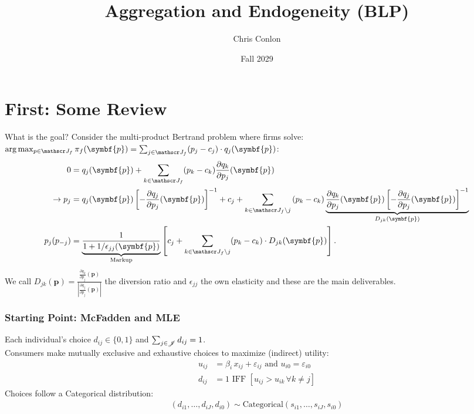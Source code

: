 \documentclass[aspectratio=169,10pt]{beamer}
\title{Aggregation and Endogeneity (BLP)}
\author{Chris Conlon}
\institute{NYU Stern}
\date{Fall 2029}
\begin{document}
\begin{frame}[plain] %
\titlepage
\end{frame}


\section{First: Some Review}

\begin{frame}{What is the goal?}
\small
Consider the multi-product Bertrand problem where firms solve: $\arg \max_{p \in \calJ_f} \pi_f (\symbf{p}) = \sum_{j \in \calJ_f} (p_j - c_j) \cdot q_j(\symbf{p})$:
\begin{align*}
 0&= q_j(\symbf{p}) + \sum_{k \in \calJ_f} (p_k - c_k) \frac{\partial q_{k}}{\partial p_j}(\symbf{p}) \\
\rightarrow p_j &=q_{j}(\symbf{p}) \left[-\frac{\partial q_{j}}{\partial p_{j}}(\symbf{p})\right]^{-1} + c_{j} + \sum_{k \in \calJ_{f} \setminus j} \left(p_{k}-c_{k}\right) \underbrace{\frac{\partial q_{k}}{\partial p_{j}}(\symbf{p})\left[-\frac{\partial q_{j}}{\partial p_{j}}(\symbf{p})\right]^{-1}}_{D_{jk}(\symbf{p})}\\
p_j(p_{-j}) &= \underbrace{\frac{1}{1+1/\epsilon_{jj}(\symbf{p})}}_{\text{Markup}} \left[ c_j + \sum_{k \in \calJ_{f} \setminus j}  (p_k-c_k) \cdot  D_{jk} (\symbf{p}) \right].
\end{align*}
We call $D_{jk}(\symbf{p}) = \frac{\frac{\partial q_{k}}{\partial p_j}(\symbf{p})}{\left| \frac{\partial q_{j}}{\partial p_j}(\symbf{p}) \right|}$ the \alert{diversion ratio} and $\epsilon_{jj}$ the \alert{own elasticity} and these are the main deliverables.
\end{frame}

\begin{frame}
\frametitle{Starting Point: McFadden and MLE}
Each individual's choice $d_{ij} \in\{0,1\}$ and $\sum_{j \in \mathscr{J}} d_{ij} =1$.\\
Consumers make mutually exclusive and exhaustive choices to maximize (indirect) utility:
\begin{align*}
u_{ij} &= \beta_i \, x_{ij}  + \varepsilon_{ij} \text{ and }
u_{i0} = \varepsilon_{i0}\\
d_{ij} &=1 \text{ IFF } [u_{ij} > u_{ik}\, \forall k \neq j]
\end{align*}
Choices follow a Categorical distribution:
\begin{align*}
(d_{i1},\ldots,d_{iJ},d_{i0}) \sim \text{Categorical} (s_{i1},\ldots,s_{iJ},s_{i0} ) 
\end{align*}
\end{frame}
\end{document}
